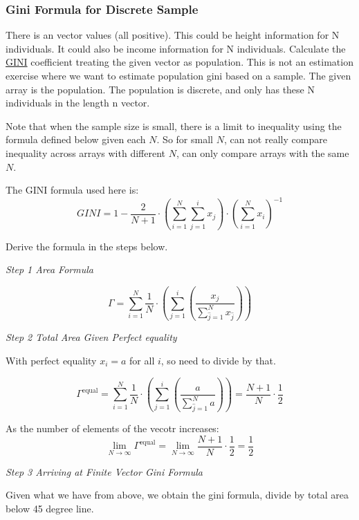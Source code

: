 \documentclass[
]{book}
\begin{document}
\hypertarget{gini-formula-for-discrete-sample}{%
\subsubsection{Gini Formula for Discrete Sample}\label{gini-formula-for-discrete-sample}}

There is an vector values (all positive). This could be height information for N individuals. It could also be income information for N individuals. Calculate the \href{https://en.wikipedia.org/wiki/Gini_coefficient}{GINI} coefficient treating the given vector as population. This is not an estimation exercise where we want to estimate population gini based on a sample. The given array is the population. The population is discrete, and only has these N individuals in the length n vector.

Note that when the sample size is small, there is a limit to inequality using the formula defined below given each \(N\). So for small \(N\), can not really compare inequality across arrays with different \(N\), can only compare arrays with the same \(N\).

The GINI formula used here is:
\[
 GINI =
  1 - \frac{2}{N+1}
  \cdot
  \left(\sum_{i=1}^N \sum_{j=1}^{i} x_j\right)
  \cdot
  \left(
    \sum_{i=1}^N x_i
  \right)^{-1}
\]

Derive the formula in the steps below.

\emph{Step 1 Area Formula}

\[
 \Gamma = \sum_{i=1}^N \frac{1}{N} \cdot \left(
     \sum_{j=1}^{i} \left(
      \frac{x_j}{\sum_{\widehat{j}=1}^N x_{\widehat{j}} }
      \right)
  \right)
\]

\emph{Step 2 Total Area Given Perfect equality}

With perfect equality \(x_i=a\) for all \(i\), so need to divide by that.

\[
 \Gamma^{\text{equal}} = \sum_{i=1}^N \frac{1}{N} \cdot \left(
     \sum_{j=1}^{i} \left(
      \frac{a}{\sum_{\widehat{j}=1}^N a }
      \right)
  \right)
  = \frac{N+1}{N}\cdot\frac{1}{2}
\]

As the number of elements of the vecotr increases:
\[
 \lim_{N \rightarrow \infty}\Gamma^{\text{equal}}
  = \lim_{N \rightarrow \infty} \frac{N+1}{N}\cdot\frac{1}{2}
  = \frac{1}{2}
\]

\emph{Step 3 Arriving at Finite Vector Gini Formula}

Given what we have from above, we obtain the gini formula, divide by total area below 45 degree line.
\end{document}

